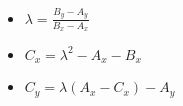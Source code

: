 \begin{itemize}
    \item[] $\lambda = \frac{B_y - A_y} {B_x - A_x}$
    \item[] $C_x = \lambda^2 - A_x - B_x$
    \item[] $C_y = \lambda(A_x - C_x) - A_y$
\end{itemize}
